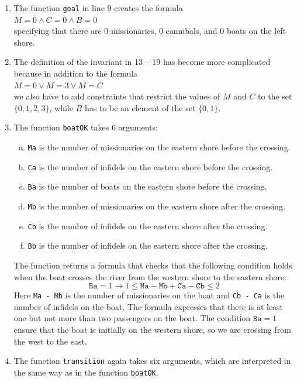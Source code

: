 \begin{enumerate}
      Note that we have to use the \texttt{Z3} function \texttt{And} to form the conjunction of the conditions.
      The function takes an arbitrary number of arguments.  The constraint solver \texttt{Z3} also provides the
      functions \texttt{Or} and \texttt{Implies}.  The function \texttt{Or} computes the disjunction of its
      arguments, while the function $\texttt{Implies}(A, B)$ represents the formula $A \rightarrow B$.
\item The function \texttt{goal} in line 9 creates the formula
      \\[0.2cm]
      \hspace*{1.3cm}
      $M = 0 \wedge C = 0 \wedge B = 0$
      \\[0.2cm]
      specifying that there are 0 missionaries, 0 cannibals, and 0 boats on the left shore.
\item The definition of the invariant in 13 -- 19 has become more complicated because in addition to the
      formula 
      \\[0.2cm]
      \hspace*{1.3cm}
      $M = 0 \vee M = 3 \vee M = C$
      \\[0.2cm]
      we also have to add constraints that restrict the values of $M$ and $C$ to the set $\{0, 1, 2, 3\}$,
      while $B$ has to be an element of the set $\{0,1\}$.
\item The function \texttt{boatOK} takes 6 arguments:
      \begin{enumerate}[(a)]
      \item \texttt{Ma} is the number of missionaries on the eastern shore before the crossing.
      \item \texttt{Ca} is the number of infidels on the eastern shore before the crossing.
      \item \texttt{Ba} is the number of boats on the eastern shore before the crossing. 
      \item \texttt{Mb} is the number of missionaries on the eastern shore after the crossing.
      \item \texttt{Cb} is the number of infidels on the eastern shore after the crossing.
      \item \texttt{Bb} is the number of infidels on the eastern shore after the crossing.
      \end{enumerate}

      The function returns a formula that checks that the following condition holds when the boat 
      crosses the river from the western shore to the eastern shore:
      $$ \mathtt{Ba} = 1 \rightarrow 1 \leq \mathtt{Ma} - \mathtt{Mb} + \mathtt{Ca} - \mathtt{Cb} \leq 2 $$
      Here \texttt{Ma - Mb} is the number of missionaries on the boat and  \texttt{Cb - Ca} is the number of
      infidels on the boat.  The formula expresses that there is at least one but not more than two passengers
      on the boat. 
      The condition $\texttt{Ba} = 1$ ensure that the boat is initially on the western shore, so we are
      crossing from the west to the east.
\item The function \texttt{transition} again takes six arguments, which are interpreted in the same way as
      in the function \texttt{boatOK}.


\end{enumerate}
